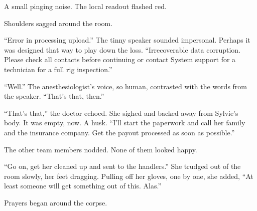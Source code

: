 \documentclass[12pt,letterpaper,oneside]{memoir}
\begin{document}
  A small pinging noise. The local readout flashed red.

  Shoulders sagged around the room.

  ``Error in processing upload.'' The tinny speaker sounded impersonal.
  Perhaps it was designed that way to play down the loss. ``Irrecoverable
  data corruption. Please check all contacts before continuing or contact
  System support for a technician for a full rig inspection.''

  ``Well.'' The anesthesiologist's voice, so human, contrasted with the
  words from the speaker. ``That's that, then.''

  ``That's that,'' the doctor echoed. She sighed and backed away from
  Sylvie's body. It was empty, now. A husk. ``I'll start the paperwork and
  call her family and the insurance company. Get the payout processed as
  soon as possible.''

  The other team members nodded. None of them looked happy.

  ``Go on, get her cleaned up and sent to the handlers.'' She trudged out
  of the room slowly, her feet dragging. Pulling off her gloves, one by
  one, she added, ``At least someone will get something out of this.
  Alas.''

  Prayers began around the corpse.
\end{document}
